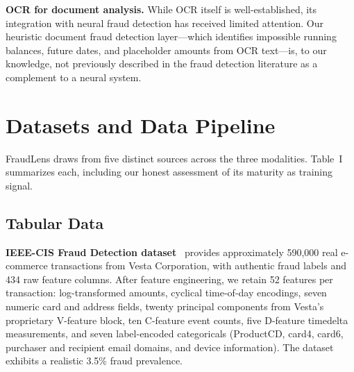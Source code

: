 \documentclass[10pt,conference,letterpaper]{IEEEtran}
\begin{document}
\textbf{OCR for document analysis.} While OCR itself is well-established, its
integration with neural fraud detection has received limited attention. Our heuristic
document fraud detection layer---which identifies impossible running balances, future
dates, and placeholder amounts from OCR text---is, to our knowledge, not previously
described in the fraud detection literature as a complement to a neural system.

\section{Datasets and Data Pipeline}

FraudLens draws from five distinct sources across the three modalities. Table~I
summarizes each, including our honest assessment of its maturity as training signal.

\begin{table}[H]
\caption{Data Sources and Component Maturity}
\label{tab:datasets}
\begin{center}
\end{center}
\end{table}

\subsection{Tabular Data}

\textbf{IEEE-CIS Fraud Detection dataset}~\cite{IEICE} provides approximately 590,000
real e-commerce transactions from Vesta Corporation, with authentic fraud labels and 434
raw feature columns. After feature engineering, we retain 52 features per transaction:
log-transformed amounts, cyclical time-of-day encodings, seven numeric card and address
fields, twenty principal components from Vesta's proprietary V-feature block, ten
C-feature event counts, five D-feature timedelta measurements, and seven label-encoded
categoricals (ProductCD, card4, card6, purchaser and recipient email domains, and device
information). The dataset exhibits a realistic 3.5\% fraud prevalence.
\end{document}

